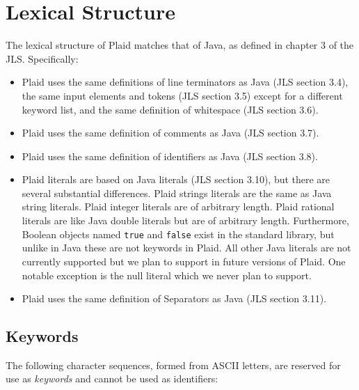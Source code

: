 \section{Lexical Structure}

The lexical structure of Plaid matches that of Java, as defined in
chapter 3 of the JLS.  Specifically:

\begin{itemize}

\item Plaid uses the same definitions of line terminators as Java (JLS
  section 3.4), the same input elements and tokens (JLS section 3.5)
  except for a different keyword list, and the same definition of
  whitespace (JLS section 3.6).

\item Plaid uses the same definition of comments as Java (JLS section 3.7).

\item Plaid uses the same definition of identifiers as Java (JLS section 3.8).

\item Plaid literals are based on Java literals (JLS section
  3.10), but there are several substantial differences. Plaid strings literals are the same as Java string literals. Plaid integer literals are of arbitrary length. Plaid rational literals are like Java double literals but are of arbitrary length. Furthermore, Boolean objects named \texttt{true} and \texttt{false} exist in the standard library, but unlike in Java these are not keywords in Plaid. All other Java literals are not currently supported but we plan to support in future versions of Plaid. One notable exception is the null literal which we never plan to support.

\item Plaid uses the same definition of Separators as Java (JLS section 3.11).

\end{itemize}


\subsection{Keywords}

The following character sequences, formed from ASCII letters, are reserved
for use as \textit{keywords} and cannot be used as identifiers:

